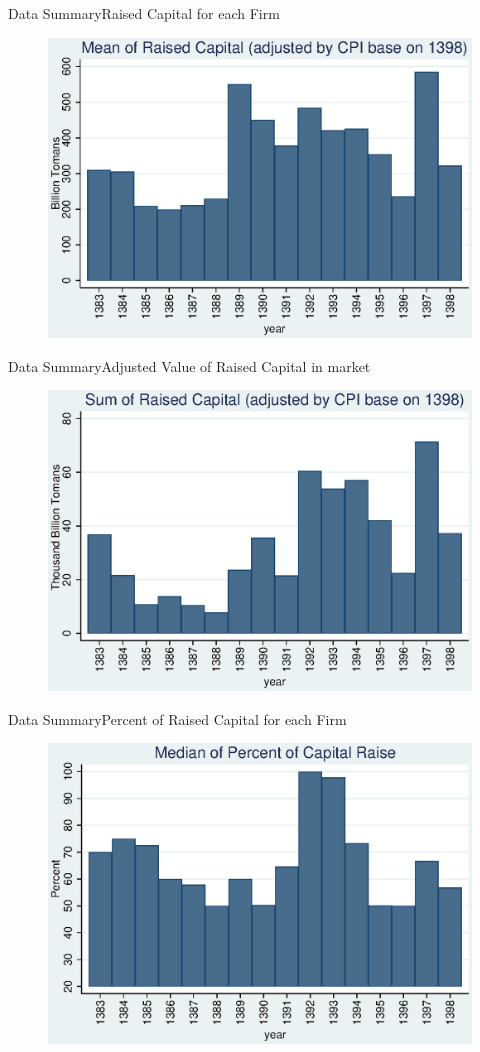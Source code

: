 \documentclass{beamer}
\begin{document}
\begin{frame}{Data Summary}{Raised Capital for each Firm}
\begin{figure}
\centering
\includegraphics[width=0.7\linewidth]{MeanCapRaiseAdjusted.eps}
\label{fig:meancapraise}
\end{figure}
\end{frame}

\begin{frame}{Data Summary}{Adjusted Value of Raised Capital in market}
\begin{figure}
\centering
\includegraphics[width=0.7\linewidth]{SumCapRaiseAdjusted.eps}
\label{fig:SumCapRaise}
\end{figure}
\end{frame}



\begin{frame}{Data Summary}{Percent of Raised Capital for each Firm}
\begin{figure}
\centering
\includegraphics[width=0.7\linewidth]{MedianPercent.eps}
\label{fig:medianpercent}
\end{figure}
\end{frame}
\end{document}
